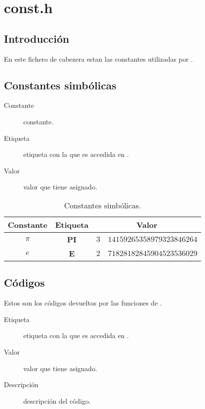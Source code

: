 %
%

\chapter{const.h}

\section{Introducci\'on}
En este fichero de cabezera estan las constantes utilizadas por \mbox{\BI}. 

\section{Constantes simb\'olicas}

\begin{description}
\item[Constante] constante.
\item[Etiqueta] etiqueta con la que es accedida en \BI.
\item[Valor] valor que tiene asignado.
\end{description}

\begin{table}[!hbp]
\begin{center}
\begin{tabular}{c|c|r @{.} l}
Constante & Etiqueta &
\multicolumn{2}{c}{Valor} \\
\hline
$\pi$ & \textbf{PI} &$3$&$14159265358979323846264$ \\
$e$ & \textbf{E} &$2$&$71828182845904523536029$ \\
\hline
\end{tabular}
\end{center}
\caption{Constantes simb\'olicas.}
\end{table}
\newpage

\section{C\'odigos} \label{sec:tiposdecodigos}

Estos son los c\'odigos devueltos por las funciones de \BI.

\begin{description}
\item[Etiqueta] etiqueta con la que es accedida en \BI.
\item[Valor] valor que tiene asignado.
\item[Descripci\'on] descripci\'on del c\'odigo.
\end{description}

